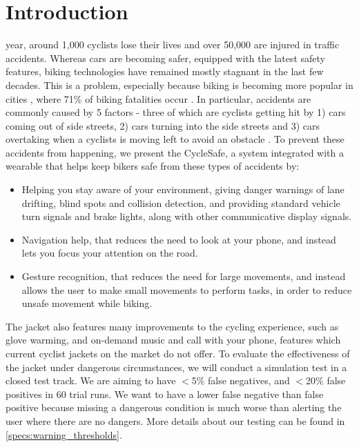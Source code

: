 \documentclass[journal]{IEEEtran}
\begin{document}
\section{Introduction}
% 
% 
 year, around 1,000 cyclists lose their lives and over 50,000 are injured in traffic accidents. Whereas cars are becoming safer, equipped with the latest safety features, biking technologies have remained mostly stagnant in the last few decades. This is a problem, especially because biking is becoming more popular in cities \cite{biking_popularity}, where 71\% of biking fatalities occur \cite{biking_crashes}. In particular, accidents are commonly caused by 5 factors - three of which are cyclists getting hit by 1) cars coming out of side streets, 2) cars turning into the side streets and 3) cars overtaking when a cyclists is moving left to avoid an obstacle \cite{biking_cases}. To prevent these accidents from happening, we present the CycleSafe, a system integrated with a wearable that helps keep bikers safe from these types of accidents by:

\begin{itemize}
    \item Helping you stay aware of your environment, giving danger warnings of lane drifting, blind spots and collision detection, and providing standard vehicle turn signals and brake lights, along with other communicative display signals.
    \item Navigation help, that reduces the need to look at your phone, and instead lets you focus your attention on the road.
    \item Gesture recognition, that reduces the need for large movements, and instead allows the user to make small movements to perform tasks, in order to reduce unsafe movement while biking.
\end{itemize}

The jacket also features many improvements to the cycling experience, such as glove warming, and on-demand music and call with your phone, features which current cyclist jackets on the market do not offer. To evaluate the effectiveness of the jacket under dangerous circumstances, we will conduct a simulation test in a closed test track. We are aiming to have $<$5\% false negatives, and $<$20\% false positives in 60 trial runs. We want to have a lower false negative than false positive because missing a dangerous condition is much worse than alerting the user where there are no dangers. More details about our testing can be found in \ref{specs:warning_thresholds}.
\end{document}

